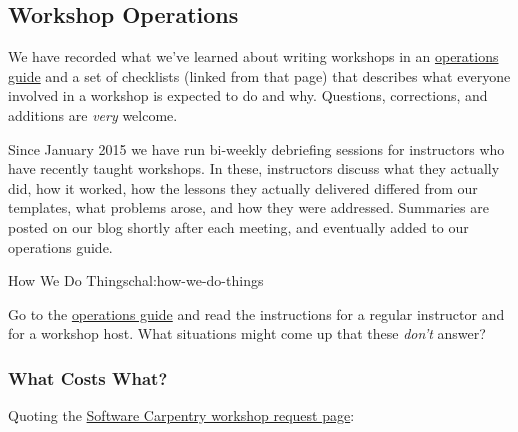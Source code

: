 \subsection{Workshop Operations}\label{workshop-operations}

We have recorded what we've learned about writing workshops in an
\href{\{\{\%20site.swc\_site\%20\}\}/workshops/operations/}{operations
guide} and a set of checklists (linked from that page) that describes
what everyone involved in a workshop is expected to do and why.
Questions, corrections, and additions are \emph{very} welcome.

Since January 2015 we have run bi-weekly debriefing sessions for
instructors who have recently taught workshops. In these, instructors
discuss what they actually did, how it worked, how the lessons they
actually delivered differed from our templates, what problems arose, and
how they were addressed. Summaries are posted on our blog shortly after
each meeting, and eventually added to our operations guide.

\begin{challenge}{How We Do Things}{chal:how-we-do-things}

Go to the
\href{\{\{\%20site.swc\_site\%20\}\}/workshops/operations/}{operations
guide} and read the instructions for a regular instructor and for a
workshop host. What situations might come up that these \emph{don't}
answer?
\end{challenge}

\subsubsection{What Costs What?}\label{what-costs-what}

Quoting the \href{\{\{\%20site.swc\_site\}\}/workshops/request/}{Software
Carpentry workshop request page}:

